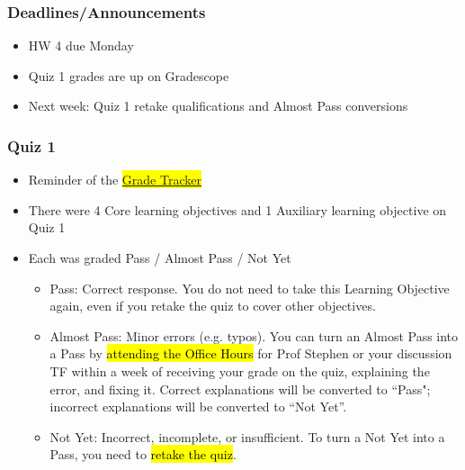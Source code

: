 
\begin{frame}
    \frametitle{Deadlines/Announcements}
\begin{itemize}
            \item HW 4 due Monday
            \item Quiz 1 grades are up on Gradescope
            \item Next week: Quiz 1 retake qualifications and Almost Pass conversions
        \end{itemize}
\end{frame}
\begin{frame}
    \frametitle{Quiz 1}
    \begin{itemize}
        \item Reminder of the \hl{\href{https://docs.google.com/spreadsheets/d/1yAqE1HUeVbe6xuhddNSIX7Y3zuvFHlsuIn8Ys7V9_a0}{Grade Tracker}}
        \item There were 4 Core learning objectives and 1 Auxiliary learning objective on Quiz 1
        \item Each was graded Pass / Almost Pass / Not Yet
        \begin{itemize}
            \item Pass: Correct response. You do not need to take this Learning Objective again, even if you retake the quiz to cover other objectives.
            \item Almost Pass: Minor errors (e.g. typos). You can turn an Almost Pass into a Pass by \hl{attending the Office Hours} for Prof Stephen or your discussion TF within a week of receiving your grade on the quiz, explaining the error, and fixing it. Correct explanations will be converted to ``Pass"; incorrect explanations will be converted to ``Not Yet''.
            \item Not Yet: Incorrect, incomplete, or insufficient. To turn a Not Yet into a Pass, you need to \hl{retake the quiz}.
        \end{itemize}
    \end{itemize}
\end{frame}

